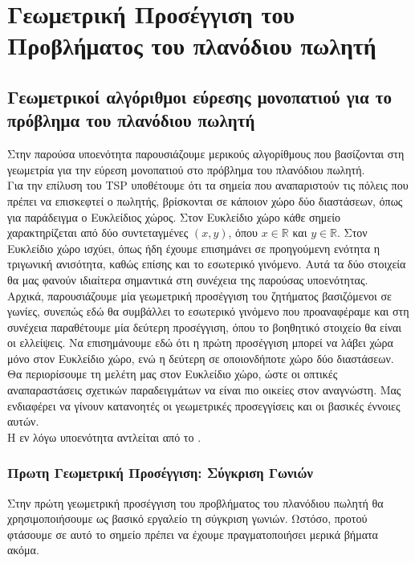 \documentclass[oneside,12pt]{book}
\newcommand{\R}{\mathbb{R}}
\theoremstyle{definition}
\begin{document}
\chapter{Γεωμετρική Προσέγγιση του Προβλήματος του πλανόδιου πωλητή}

\section{Γεωμετρικοί αλγόριθμοι εύρεσης μονοπατιού για το πρόβλημα του πλανόδιου πωλητή}

Στην παρούσα υποενότητα παρουσιάζουμε μερικούς αλγορίθμους που βασίζονται στη γεωμετρία για την εύρεση μονοπατιού στο πρόβλημα του πλανόδιου πωλητή. \\

Για την επίλυση του TSP υποθέτουμε ότι τα σημεία που αναπαριστούν τις πόλεις που πρέπει να επισκεφτεί ο πωλητής, βρίσκονται σε κάποιον χώρο δύο διαστάσεων, όπως για παράδειγμα ο Ευκλείδιος χώρος. Στον Ευκλείδιο χώρο κάθε σημείο χαρακτηρίζεται από δύο συντεταγμένες \((x,y)\), όπου \(x \in \R\) και \(y \in \R\). Στον Ευκλείδιο χώρο ισχύει, όπως ήδη έχουμε επισημάνει σε προηγούμενη ενότητα η τριγωνική ανισότητα, καθώς επίσης και το εσωτερικό γινόμενο. Αυτά τα δύο στοιχεία θα μας φανούν ιδιαίτερα σημαντικά στη συνέχεια της παρούσας υποενότητας. \\

Αρχικά, παρουσιάζουμε μία γεωμετρική προσέγγιση του ζητήματος βασιζόμενοι σε γωνίες, συνεπώς εδώ θα συμβάλλει το εσωτερικό γινόμενο που προαναφέραμε και στη συνέχεια παραθέτουμε μία δεύτερη προσέγγιση, όπου το βοηθητικό στοιχείο θα είναι οι ελλείψεις. Να επισημάνουμε εδώ ότι η πρώτη προσέγγιση μπορεί να λάβει χώρα μόνο στον Ευκλείδιο χώρο, ενώ η δεύτερη σε οποιονδήποτε χώρο δύο διαστάσεων. Θα περιορίσουμε τη μελέτη μας στον Ευκλείδιο χώρο, ώστε οι οπτικές αναπαραστάσεις σχετικών παραδειγμάτων να είναι πιο οικείες στον αναγνώστη. Μας ενδιαφέρει να γίνουν κατανοητές οι γεωμετρικές προσεγγίσεις και οι βασικές έννοιες αυτών. \\

Η εν λόγω υποενότητα αντλείται από το \cite{16}.

\subsection{Πρωτη Γεωμετρική Προσέγγιση: Σύγκριση Γωνιών} 

Στην πρώτη γεωμετρική προσέγγιση του προβλήματος του πλανόδιου πωλητή θα χρησιμοποιήσουμε ως βασικό εργαλείο τη σύγκριση γωνιών. Ωστόσο, προτού φτάσουμε σε αυτό το σημείο πρέπει να έχουμε πραγματοποιήσει μερικά βήματα ακόμα. \\
\end{document}
